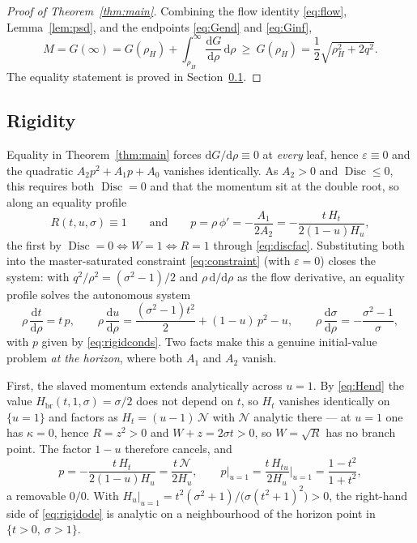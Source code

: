 \documentclass[11pt]{article}
\theoremstyle{plain}
\theoremstyle{definition}
\newcommand{\dd}{\mathrm{d}}
\newcommand{\rH}{\rho_{\!H}}
\newcommand{\Hbr}{H_{\mathrm{br}}}
\newcommand{\Disc}{\operatorname{Disc}}
\newcommand{\eps}{\varepsilon}
\begin{document}
\begin{proof}[Proof of Theorem~\ref{thm:main}]
Combining the flow identity \eqref{eq:flow}, Lemma~\ref{lem:psd}, and the endpoints \eqref{eq:Gend} and
\eqref{eq:Ginf},
\[
  M=G(\infty)=G(\rH)+\int_{\rH}^{\infty}\frac{\dd G}{\dd\rho}\,\dd\rho
   \ \ge\ G(\rH)=\frac12\sqrt{\rH^2+2q^2}.
\]
The equality statement is proved in Section~\ref{sec:rigidity}.
\end{proof}

\subsection{Rigidity}\label{sec:rigidity}

Equality in Theorem~\ref{thm:main} forces $\dd G/\dd\rho\equiv0$ at \emph{every} leaf, hence $\eps\equiv0$ and
the quadratic $A_2p^2+A_1p+A_0$ vanishes identically. As $A_2>0$ and $\Disc\le0$, this requires both
$\Disc=0$ and that the momentum sit at the double root, so along an equality profile
\begin{equation}\label{eq:rigidconds}
  R(t,u,\sigma)\equiv1\qquad\text{and}\qquad p=\rho\,\phi'=-\frac{A_1}{2A_2}=-\frac{t\,H_t}{2(1-u)H_u} ,
\end{equation}
the first by $\Disc=0\Leftrightarrow W=1\Leftrightarrow R=1$ through \eqref{eq:discfac}. Substituting both
into the master-saturated constraint \eqref{eq:constraint} (with $\eps=0$) closes the system: with
$q^2/\rho^2=(\sigma^2-1)/2$ and $\rho\,\dd/\dd\rho$ as the flow derivative, an equality profile solves the
autonomous system
\begin{equation}\label{eq:rigidode}
  \rho\,\frac{\dd t}{\dd\rho}=t\,p,\qquad
  \rho\,\frac{\dd u}{\dd\rho}=\frac{(\sigma^2-1)t^2}{2}+(1-u)\,p^2-u,\qquad
  \rho\,\frac{\dd\sigma}{\dd\rho}=-\frac{\sigma^2-1}{\sigma},
\end{equation}
with $p$ given by \eqref{eq:rigidconds}. Two facts make this a genuine initial-value problem \emph{at the
horizon}, where both $A_1$ and $A_2$ vanish.

First, the slaved momentum extends analytically across $u=1$. By \eqref{eq:Hend} the value
$\Hbr(t,1,\sigma)=\sigma/2$ does not depend on $t$, so $H_t$ vanishes identically on $\{u=1\}$ and factors as
$H_t=(u-1)\,\mathcal N$ with $\mathcal N$ analytic there --- at $u=1$ one has $\kappa=0$, hence $R=z^2>0$ and $W+z=2\sigma t>0$,
so $W=\sqrt R$ has no branch point. The factor $1-u$ therefore cancels, and
\begin{equation}\label{eq:pana}
  p=-\frac{t\,H_t}{2(1-u)H_u}=\frac{t\,\mathcal N}{2H_u},\qquad
  p\big|_{u=1}=\frac{t\,H_{tu}}{2H_u}\bigg|_{u=1}=\frac{1-t^2}{1+t^2},
\end{equation}
a removable $0/0$. With $H_u|_{u=1}=t^2(\sigma^2+1)/\big(\sigma(t^2+1)^2\big)>0$, the right-hand side of
\eqref{eq:rigidode} is analytic on a neighbourhood of the horizon point in $\{t>0,\ \sigma>1\}$.
\end{document}
